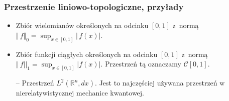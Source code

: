 \documentclass[10pt,t]{beamer}
\begin{document}
\begin{frame}
  \frametitle{Przestrzenie liniowo-topologiczne, przyłady}


  \begin{itemize}
    \RaggedRight

  \item Zbiór wielomianów określonych na odcinku $[ 0, 1 ]$ z~normą \\
    $\Vert \, f \Vert_{ 0 } = \sup_{ x \in [ 0, 1 ] } | \, f( x ) |$.

  \item Zbiór funkcji ciągłych określonych na odcinku $[ 0, 1 ]$ z~normą
    $\Vert \, f ||_{ 1 } = \sup_{ x \in [0, 1] } |f(x)| $.
Przestrzeń tą oznaczamy $\mathcal{ C } [0, 1]$.
\pause
\item[--]Przestrzeń $L^{ 2 }( \mathbb{ R }^{ n }, dx) $. Jest to najczęściej używana przestrzeń w nierelatywistycznej mechanice kwantowej.
\end{itemize}

\end{frame}










\end{document}
